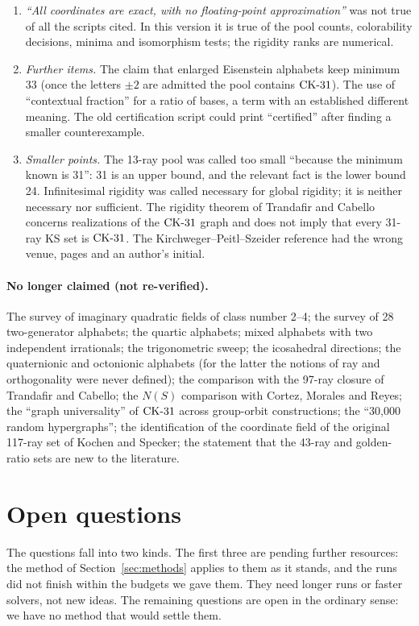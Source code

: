\begin{enumerate}[label=C\arabic*.,leftmargin=2.6em]
\item \emph{``All coordinates are exact, with no floating-point approximation''} was not true of
all the scripts cited.  In this version it is true of the pool counts, colorability decisions,
minima and isomorphism tests; the rigidity ranks are numerical.
\item \emph{Further items.}  The claim that enlarged Eisenstein alphabets keep minimum 33 (once
the letters $\pm2$ are admitted the pool contains $\mathrm{CK}\text{-}31$).  The use of ``contextual fraction'' for
a ratio of bases, a term with an established different meaning.  The old certification script
could print ``certified'' after finding a smaller counterexample.\item \emph{Smaller points.}  The 13-ray pool was called too small ``because the minimum known is
31'': 31 is an upper bound, and the relevant fact is the lower bound 24.  Infinitesimal rigidity
was called necessary for global rigidity; it is neither necessary nor sufficient.  The rigidity
theorem of Trandafir and Cabello concerns realizations of the $\mathrm{CK}\text{-}31$ graph and does not imply that
every 31-ray KS set is $\mathrm{CK}\text{-}31$.  The Kirchweger--Peitl--Szeider reference had the wrong venue,
pages and an author's initial.
\end{enumerate}

\paragraph{No longer claimed (not re-verified).}
The survey of imaginary quadratic fields of class number 2--4; the survey of 28 two-generator
alphabets; the quartic alphabets; mixed alphabets with two independent irrationals; the
trigonometric sweep; the icosahedral directions; the quaternionic and octonionic alphabets (for
the latter the notions of ray and orthogonality were never defined); the comparison with the
97-ray closure of Trandafir and Cabello; the $N(S)$ comparison with Cortez, Morales and Reyes;
the ``graph universality'' of $\mathrm{CK}\text{-}31$ across group-orbit constructions; the ``30{,}000 random
hypergraphs''; the identification of the coordinate field of the original 117-ray set of Kochen
and Specker; the statement that the 43-ray and golden-ratio sets are new to the literature.

\section{Open questions}\label{sec:limitations}

The questions fall into two kinds.  The first three are pending further resources: the method of
Section~\ref{sec:methods} applies to them as it stands, and the runs did not finish within the
budgets we gave them.  They need longer runs or faster solvers, not new ideas.  The remaining
questions are open in the ordinary sense: we have no method that would settle them.

